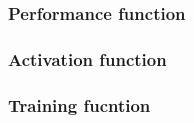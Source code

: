  \subsubsection{Performance function}

 \subsubsection{Activation function}

 \subsubsection{Training fucntion}
